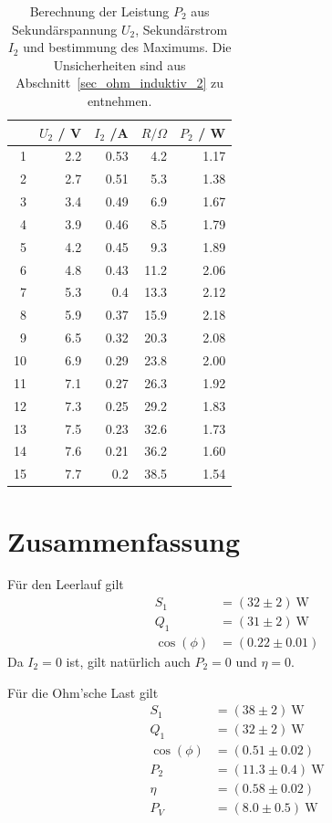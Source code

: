 \documentclass{article}
\newcommand{\W}{\text{W}}
\begin{document}
\begin{table}[H]
\centering
\caption{Berechnung der Leistung $P_2$ aus Sekundärspannung $U_2$, Sekundärstrom $I_2$ und bestimmung des Maximums. Die Unsicherheiten sind aus Abschnitt~\ref{sec_ohm_induktiv_2} zu entnehmen.}
\label{tab:spule}
\begin{tabular}{r|rrrr}
  &	$U_2$ / V  &	$I_2$ /A  &	$R / \Omega$ & $P_2$ / W \\
  \hline
1 &	2.2	&0.53	&	4.2	 &	1.17 \\
2 &	2.7	&0.51	&	5.3	 &	1.38 \\
3 &	3.4	&0.49	&	6.9  &	1.67 \\
4 &	3.9	&0.46	&	8.5	 &	1.79 \\
5 &	4.2	&0.45	&	9.3	 &	1.89 \\
6 &	4.8	&0.43	&	11.2	 &	2.06 \\
7 &	5.3	&0.4		&   13.3 &	2.12 \\
{\color{red}8} &	\color{red} 5.9	& \color{red} 0.37	& \color{red} 15.9	 &	\color{red} 2.18 \\
9 &	6.5	&0.32	&	20.3	 &	2.08 \\
10&	6.9	&0.29	&	23.8	 &	2.00 \\
11&	7.1	&0.27	&	26.3	 &	1.92 \\
12&	7.3	&0.25	&	29.2	 &	1.83 \\
13&	7.5	&0.23	&	32.6	 & 	1.73 \\
14&	7.6	&0.21	&	36.2 &	1.60 \\
15&	7.7	&0.2		&   38.5 &	1.54
\end{tabular}

\end{table}

\section{Zusammenfassung}

Für den Leerlauf gilt
\begin{align*}
S_1 &= (32 \pm 2)~\W \\
Q_1 &= (31 \pm 2)~\W \\
\cos(\phi) &= (0.22 \pm 0.01)
\end{align*}
Da $I_2=0$ ist, gilt natürlich auch $P_2=0$ und $\eta = 0$.


Für die Ohm'sche Last gilt
\begin{align*}
S_1 &= (38 \pm 2)~\W \\
Q_1 &= (32 \pm 2)~\W \\
\cos(\phi) &= (0.51 \pm 0.02) \\
P_2 &= (11.3 \pm 0.4)~\W \\
\eta &= (0.58 \pm 0.02) \\
P_V &= (8.0 \pm 0.5)~\W
\end{align*}
\end{document}

